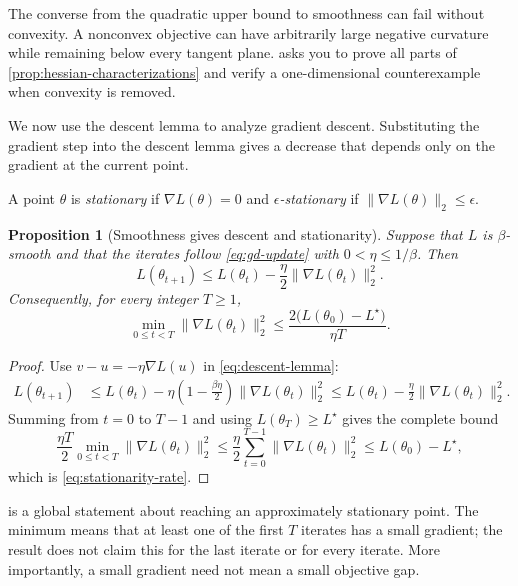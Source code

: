\documentclass[11pt,twoside]{article}
\newtheorem{proposition}[theorem]{Proposition}
\theoremstyle{definition}
\theoremstyle{remark}
\begin{document}
The converse from the quadratic upper bound to smoothness can fail without
convexity. A nonconvex objective can have arbitrarily large negative curvature
while remaining below every tangent plane.
 asks you to prove all parts of
\cref{prop:hessian-characterizations} and verify a one-dimensional
counterexample when convexity is removed.

We now use the descent lemma to analyze gradient descent. Substituting the
gradient step into the descent lemma gives a decrease that depends only on the
gradient at the current point.

A point $\theta$ is \emph{stationary} if $\nabla L(\theta)=0$ and
\emph{$\epsilon$-stationary} if $\|\nabla L(\theta)\|_2\le\epsilon$.

\begin{proposition}[Smoothness gives descent and stationarity]
\label{prop:smooth-stationarity}
Suppose that $L$ is $\beta$-smooth and that the iterates follow
\cref{eq:gd-update} with $0<\eta\le1/\beta$. Then
\begin{equation}
 L(\theta_{t+1})
 \le L(\theta_t)-\frac\eta2\|\nabla L(\theta_t)\|_2^2.
 \label{eq:basic-descent}
\end{equation}
Consequently, for every integer $T\ge1$,
\begin{equation}
 \min_{0\le t<T}\|\nabla L(\theta_t)\|_2^2
 \le \frac{2\bigl(L(\theta_0)-L^\star\bigr)}{\eta T}.
 \label{eq:stationarity-rate}
\end{equation}
\end{proposition}

\begin{proof}
Use $v-u=-\eta\nabla L(u)$ in \cref{eq:descent-lemma}:
\begin{align*}
 L(\theta_{t+1})
 &\le L(\theta_t)
 -\eta\left(1-\frac{\beta\eta}{2}\right)
       \|\nabla L(\theta_t)\|_2^2
 \le L(\theta_t)-\frac\eta2
       \|\nabla L(\theta_t)\|_2^2.
\end{align*}
Summing from $t=0$ to $T-1$ and using $L(\theta_T)\ge L^\star$ gives the
complete bound
\[
 \frac{\eta T}{2}\min_{0\le t<T}\|\nabla L(\theta_t)\|_2^2
 \le \frac\eta2\sum_{t=0}^{T-1}\|\nabla L(\theta_t)\|_2^2
 \le L(\theta_0)-L^\star,
\]
which is \cref{eq:stationarity-rate}.
\end{proof}

 is a global statement about reaching an
approximately stationary point. The minimum means that at least one of the
first $T$ iterates has a small gradient; the result does not claim this for the
last iterate or for every iterate. More importantly, a small gradient need not
mean a small objective gap.
\end{document}
